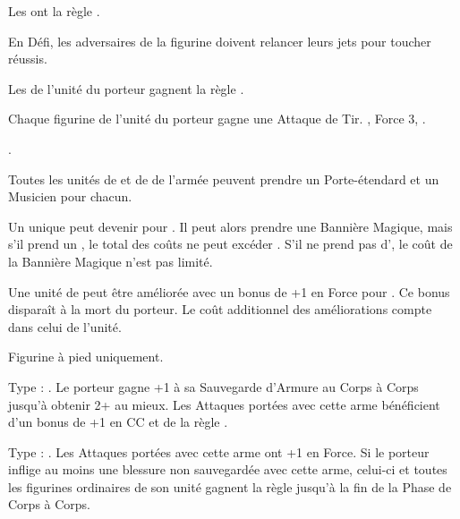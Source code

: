 \begin{multicols}{2}
Les \aspectsofnature{} ont la règle \oneperarmy{}.

\startpricelistNSP

 En Défi, les adversaires de la figurine doivent relancer leurs jets pour toucher réussis.

 Les \dryads{} de l'unité du porteur gagnent la règle \hatred{}.

 Chaque figurine de l'unité du porteur gagne une Attaque de Tir. , Force 3, .

 .

Toutes les unités de \dryads{} et de \thicketbeasts{} de l'armée peuvent prendre un Porte-étendard et un Musicien pour  chacun.

Un unique \thicketshepherd{} peut devenir \bsb{} pour . Il peut alors prendre une Bannière Magique, mais s'il prend un \aspectofnature{}, le total des coûts ne peut excéder . S'il ne prend pas d'\aspectofnature{}, le coût de la Bannière Magique n'est pas limité.

 Une unité de \thicketbeasts{} peut être améliorée avec un bonus de +1 en Force pour \permodel{}. Ce bonus disparaît à la mort du porteur. Le coût additionnel des améliorations compte dans celui de l'unité.

\endpricelistNSP
\closearmynewsection

\vspace*{\fill}
\end{multicols}







\startarmymagicalitems

\armymagicalweapons

\startpricelist

Figurine à pied uniquement.

Type : \gw{}. Le porteur gagne +1 à sa Sauvegarde d'Armure au Corps à Corps jusqu'à obtenir 2+ au mieux. Les Attaques portées avec cette arme bénéficient d'un bonus de +1 en CC et de la règle .

Type : \spear{}. Les Attaques portées avec cette arme ont +1 en Force. Si le porteur inflige au moins une blessure non sauvegardée avec cette arme, celui-ci et toutes les figurines ordinaires de son unité gagnent la règle \distracting{} jusqu'à la fin de la Phase de Corps à Corps.

